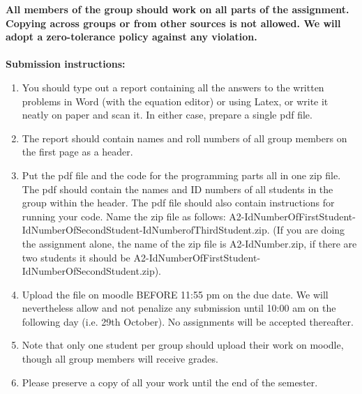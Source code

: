 \documentclass[11pt]{article}
\begin{document}
\maketitle

\textbf{All members of the group should work on all parts of the assignment. Copying across groups or from other sources is not allowed. We will adopt a \textbf{zero-tolerance policy} against any violation.}
\\
\\
\textbf{Submission instructions:} 
\begin{enumerate}
\item You should type out a report containing all the answers to the written problems in Word (with the equation editor) or using Latex, or write it neatly on paper and scan it. In either case, prepare a single pdf file. 
\item The report should contain names and roll numbers of all group members on the first page as a header.
\item Put the pdf file and the code for the programming parts all in one zip file. The pdf should contain the names and ID numbers of all students in the group within the header. The pdf file should also contain instructions for running your code. Name the zip file as follows: A2-IdNumberOfFirstStudent-IdNumberOfSecondStudent-IdNumberofThirdStudent.zip. (If you are doing the assignment alone, the name of the zip file is A2-IdNumber.zip, if there are two students it should be A2-IdNumberOfFirstStudent-IdNumberOfSecondStudent.zip). 
\item Upload the file on moodle BEFORE 11:55 pm on the due date. We will nevertheless allow and not penalize any submission until 10:00 am on the following day (i.e. 29th October). No assignments will be accepted thereafter. 
\item Note that only one student per group should upload their work on moodle, though all group members will receive grades. 
\item Please preserve a copy of all your work until the end of the semester. 
\end{enumerate}
\end{document}
